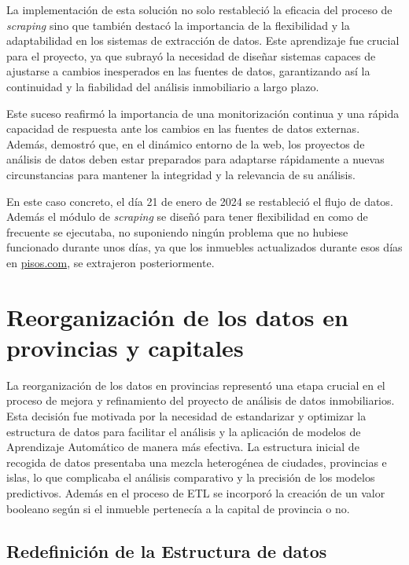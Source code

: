 La implementación de esta solución no solo restableció la eficacia del proceso de \textit{scraping} sino que también destacó la importancia de la flexibilidad y la adaptabilidad en los sistemas de extracción de datos. Este aprendizaje fue crucial para el proyecto, ya que subrayó la necesidad de diseñar sistemas capaces de ajustarse a cambios inesperados en las fuentes de datos, garantizando así la continuidad y la fiabilidad del análisis inmobiliario a largo plazo.

Este suceso reafirmó la importancia de una monitorización continua y una rápida capacidad de respuesta ante los cambios en las fuentes de datos externas. Además, demostró que, en el dinámico entorno de la web, los proyectos de análisis de datos deben estar preparados para adaptarse rápidamente a nuevas circunstancias para mantener la integridad y la relevancia de su análisis.

En este caso concreto, el día 21 de enero de 2024 se restableció el flujo de datos. Además el módulo de \textit{scraping} se diseñó para tener flexibilidad en como de frecuente se ejecutaba, no suponiendo ningún problema que no hubiese funcionado durante unos días, ya que los inmuebles actualizados durante esos días en \url{pisos.com}, se extrajeron posteriormente.

\clearpage
\section{Reorganización de los datos en provincias y capitales}\label{sec:provincias}

La reorganización de los datos en provincias representó una etapa crucial en el proceso de mejora y refinamiento del proyecto de análisis de datos inmobiliarios. Esta decisión fue motivada por la necesidad de estandarizar y optimizar la estructura de datos para facilitar el análisis y la aplicación de modelos de Aprendizaje Automático de manera más efectiva. La estructura inicial de recogida de datos presentaba una mezcla heterogénea de ciudades, provincias e islas, lo que complicaba el análisis comparativo y la precisión de los modelos predictivos. Además en el proceso de ETL se incorporó la creación de un valor booleano según si el inmueble pertenecía a la capital de provincia o no.

\subsection{Redefinición de la Estructura de datos}

